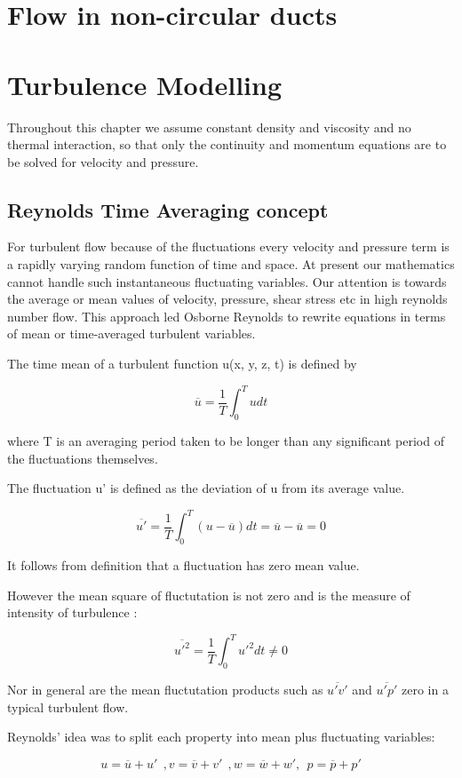 \documentclass{report}
\begin{document}
\section{Flow in non-circular ducts}
\section{Turbulence Modelling}
Throughout this chapter we assume constant density and viscosity and no thermal
interaction, so that only the continuity and momentum equations are to be solved for
velocity and pressure.

\subsection{Reynolds Time Averaging concept}
For turbulent flow because of the fluctuations every velocity and pressure term is a rapidly
varying random function of time and space. At present our mathematics cannot handle such instantaneous fluctuating variables. Our attention
is towards the average or mean values of velocity, pressure, shear stress etc in high reynolds number flow. This approach led Osborne 
Reynolds to rewrite equations in terms of mean or time-averaged turbulent variables.

The time mean of a turbulent function u(x, y, z, t) is defined by 

\[ \overline{u} = \frac{1}{T} \int_{0}^{T} u dt \]

where T is an averaging period taken to be longer than any significant period of the
fluctuations themselves.

The fluctuation u' is defined as the deviation of u from its average value.

\[ \overline{u '} = \frac{1}{T} \int_{0}^{T} ( u - \overline{u}) dt = \overline{u} - \overline{u} = 0 \]

It follows from definition that a fluctuation has zero mean value. 

However the mean square of fluctutation is not zero and is the measure of intensity of turbulence :

\[ \overline{{u'}^2} = \frac{1}{T} \int_{0}^{T} {u'}^2 dt \neq 0\]

Nor in general are the mean fluctutation products such as \(\overline{u'v'}\) and \(\overline{u'p'}\) zero in a typical turbulent flow.

Reynolds' idea was to split each property into mean plus fluctuating variables:

\[ u = \overline{u} + u'\ \ , v = \overline{v} + v' \ \ , w = \overline{w} + w', \ \  p = \overline{p} + p' \]
\end{document}
